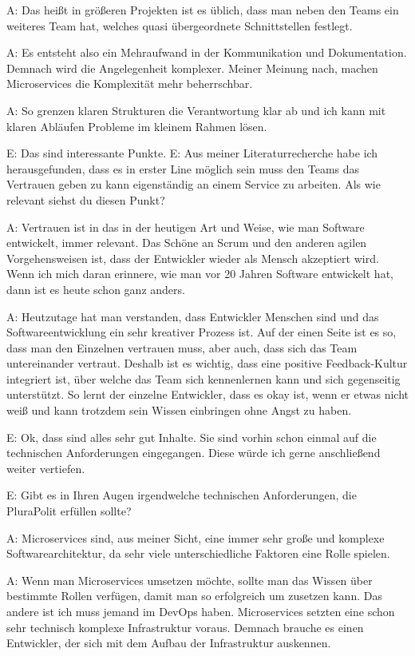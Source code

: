 A: Das heißt in größeren Projekten ist es üblich, dass man neben den Teams ein weiteres Team hat, welches quasi übergeordnete Schnittstellen festlegt.

A: Es entsteht also ein Mehraufwand in der Kommunikation und Dokumentation. Demnach wird die Angelegenheit komplexer. Meiner Meinung nach, machen Microservices die Komplexität mehr beherrschbar.

A: So grenzen klaren Strukturen die Verantwortung klar ab und ich kann mit klaren Abläufen Probleme im kleinem Rahmen lösen.

E: Das sind interessante Punkte.
E: Aus meiner Literaturrecherche habe ich herausgefunden, dass es in erster Line möglich sein muss den Teams das Vertrauen geben zu kann eigenständig an einem Service zu arbeiten. Als wie relevant siehst du diesen Punkt?

A: Vertrauen ist in das in der heutigen Art und Weise, wie man Software entwickelt, immer relevant. Das Schöne an Scrum und den anderen agilen Vorgehensweisen ist, dass der Entwickler wieder als Mensch akzeptiert wird. Wenn ich mich daran erinnere, wie man vor 20 Jahren Software entwickelt hat, dann ist es heute schon ganz anders.

A: Heutzutage hat man verstanden, dass Entwickler Menschen sind und das Softwareentwicklung ein sehr kreativer Prozess ist. Auf der einen Seite ist es so, dass man den  Einzelnen vertrauen muss, aber auch, dass sich das Team untereinander vertraut. Deshalb ist es wichtig, dass eine positive Feedback-Kultur integriert ist, über welche das Team sich kennenlernen kann und sich gegenseitig unterstützt. So lernt der einzelne Entwickler, dass es okay ist, wenn er etwas nicht weiß und kann trotzdem sein Wissen einbringen ohne Angst zu haben.

E: Ok, dass sind alles sehr gut Inhalte. Sie sind vorhin schon einmal auf die technischen Anforderungen eingegangen. Diese würde ich gerne anschließend weiter vertiefen.

E: Gibt es in Ihren Augen irgendwelche technischen Anforderungen, die PluraPolit erfüllen sollte? 

A: Microservices sind, aus meiner Sicht, eine immer sehr große und komplexe Softwarearchitektur, da sehr viele unterschiedliche Faktoren eine Rolle spielen.

A: Wenn man Microservices umsetzen möchte, sollte man das Wissen über bestimmte Rollen verfügen, damit man so erfolgreich um zusetzen kann. Das andere ist ich muss jemand im DevOps haben. Microservices setzten eine schon sehr technisch komplexe Infrastruktur voraus. Demnach brauche es einen Entwickler, der sich mit dem Aufbau der Infrastruktur auskennen.

